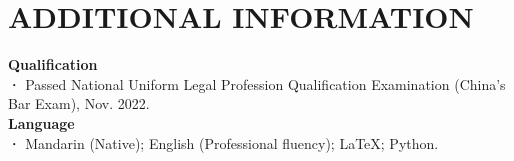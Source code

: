\documentclass[a4paper,9pt]{extarticle}
\begin{document}

\section*{ADDITIONAL INFORMATION}

\noindent
\textbf{Qualification} \\ 
\textbf{·}  Passed National Uniform Legal Profession Qualification Examination (China's Bar Exam), Nov. 2022. \\
\noindent
\textbf{Language}\\
\textbf{·}  Mandarin (Native); English (Professional fluency); \LaTeX; Python.\\

\end{document}
